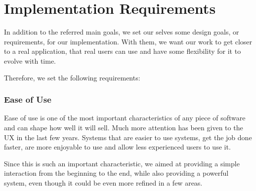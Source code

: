 











\section{Implementation Requirements} %
\label{reqs:Implementation_Requirements}

In addition to the referred main goals, we set our selves some design goals, or requirements, for our implementation. With them, we want our work to get closer to a real application, that real users can use and have some flexibility for it to evolve with time.

Therefore, we set the following requirements:

\subsubsection{Ease of Use} %
\label{reqs:ease_of_use}

Ease of use is one of the most important characteristics of any piece of software and can shape how well it will sell. Much more attention has been given to the \ac{UX} in the last few years. Systems that are easier to use systems, get the job done faster, are more enjoyable to use and allow less experienced users to use it.

Since this is such an important characteristic, we aimed at providing a simple interaction from the beginning to the end, while also providing a powerful system, even though it could be even more refined in a few areas.


